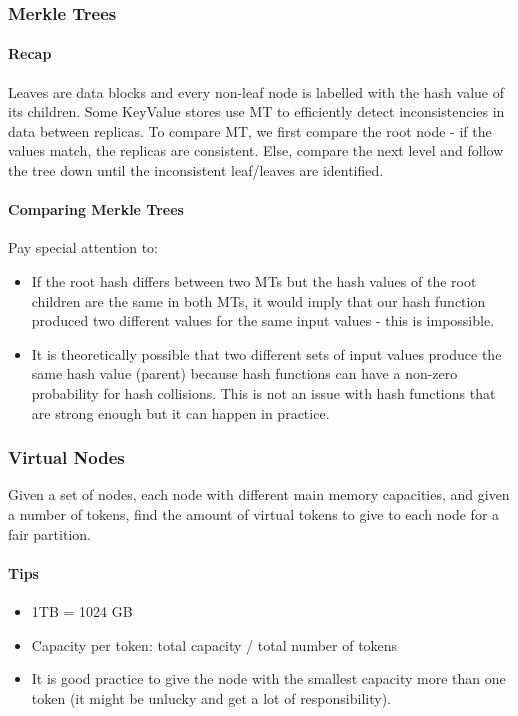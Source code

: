 


\subsubsection{Merkle Trees}

\paragraph{Recap}
Leaves are data blocks and every non-leaf node is labelled with the hash value of its children. Some KeyValue stores use MT to efficiently detect inconsistencies in data between replicas. To compare MT, we first compare the root node - if the values match, the replicas are consistent. Else, compare the next level and follow the tree down until the inconsistent leaf/leaves are identified.


\paragraph{Comparing Merkle Trees}
Pay special attention to:
\begin{itemize}
    \item If the root hash differs between two MTs but the hash values of the root children are the same in both MTs, it would imply that our hash function produced two different values for the same input values - this is impossible.
    \item It is theoretically possible that two different sets of input values produce the same hash value (parent) because hash functions can have a non-zero probability for hash collisions. This is not an issue with hash functions that are strong enough but it can happen in practice.
\end{itemize}


\subsubsection{Virtual Nodes}

Given a set of nodes, each node with different main memory capacities, and given a number of tokens, find the amount of virtual tokens to give to each node for a fair partition.

\paragraph{Tips}
\begin{itemize}
    \item 1TB = 1024 GB
    \item Capacity per token: total capacity / total number of tokens
    \item It is good practice to give the node with the smallest capacity more than one token (it might be unlucky and get a lot of responsibility). %
\end{itemize}

